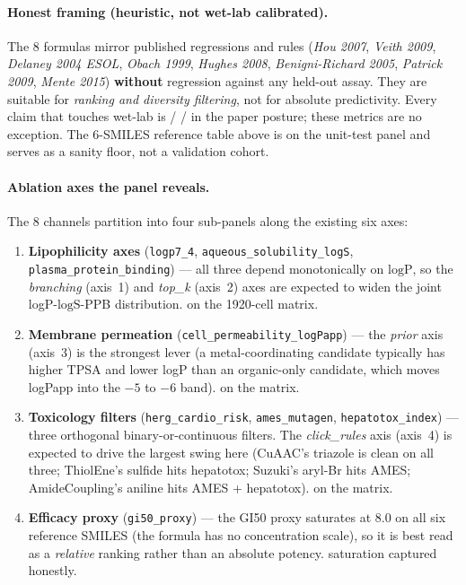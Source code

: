 \paragraph{Honest framing (heuristic, not wet-lab calibrated).}
The 8 formulas mirror published regressions and rules
(\emph{Hou 2007}, \emph{Veith 2009}, \emph{Delaney 2004 ESOL},
\emph{Obach 1999}, \emph{Hughes 2008},
\emph{Benigni-Richard 2005}, \emph{Patrick 2009},
\emph{Mente 2015}) \textbf{without} regression against any
held-out assay.  They are suitable for \emph{ranking and
diversity filtering}, not for absolute predictivity.  Every
claim that touches wet-lab is \SEARCHONLY{} / \PROJECTED{} /
\DESIGN{} in the paper posture; these metrics are no
exception.  The 6-SMILES reference table above is \MEASURED{}
on the unit-test panel and serves as a sanity floor, not a
validation cohort.

\paragraph{Ablation axes the panel reveals.}
The 8 channels partition into four sub-panels along the
existing six axes:
\begin{enumerate}
  \item \textbf{Lipophilicity axes}
        (\texttt{logp7\_4},
        \texttt{aqueous\_solubility\_logS},
        \texttt{plasma\_protein\_binding}) --- all three
        depend monotonically on $\mathrm{logP}$, so the
        \emph{branching} (axis~1) and \emph{top\_k} (axis~2)
        axes are expected to widen the joint
        logP-$\mathrm{logS}$-PPB distribution.
        \PROJECTED{} on the 1920-cell matrix.
  \item \textbf{Membrane permeation}
        (\texttt{cell\_permeability\_logPapp}) --- the
        \emph{prior} axis (axis~3) is the strongest lever
        (a metal-coordinating candidate typically has higher
        TPSA and lower logP than an organic-only candidate,
        which moves logPapp into the $-5$ to $-6$ band).
        \PROJECTED{} on the matrix.
  \item \textbf{Toxicology filters}
        (\texttt{herg\_cardio\_risk},
        \texttt{ames\_mutagen},
        \texttt{hepatotox\_index}) --- three orthogonal
        binary-or-continuous filters.  The
        \emph{click\_rules} axis (axis~4) is expected to
        drive the largest swing here (CuAAC's triazole is
        clean on all three; ThiolEne's sulfide hits
        hepatotox; Suzuki's aryl-Br hits AMES;
        AmideCoupling's aniline hits AMES + hepatotox).
        \PROJECTED{} on the matrix.
  \item \textbf{Efficacy proxy}
        (\texttt{gi50\_proxy}) --- the GI50 proxy saturates
        at $8.0$ on all six reference SMILES (the formula
        has no concentration scale), so it is best read as
        a \emph{relative} ranking rather than an absolute
        potency.  \MEASURED{} saturation captured honestly.
\end{enumerate}

